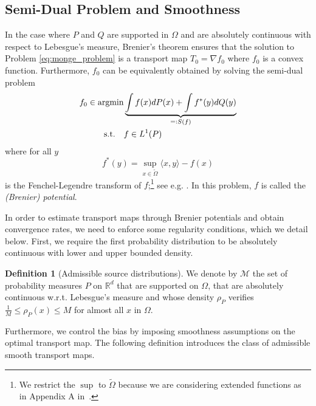 \documentclass{article}
\theoremstyle{plain}
\theoremstyle{definition}
\newtheorem{definition}[theorem]{Definition}
\theoremstyle{remark}
\newcommand{\R}[0]{\mathbb{R}}
\newcommand{\argmin}[0]{\operatorname{argmin}}
\newcommand{\defeq}{=\vcentcolon}
\begin{document}
\subsection{Semi-Dual Problem and Smoothness}

In the case where $P$ and $Q$ are supported in $\Omega$ and are absolutely continuous with respect to Lebesgue's measure, Brenier's theorem \cite{brenier1991polar} ensures that the solution to Problem \eqref{eq:monge_problem} is a transport map $ T_0 = \nabla f_0 $ where $f_0$ is a convex function. Furthermore, $f_0$ can be equivalently obtained by solving the semi-dual problem
\begin{equation}
\label{eq:semi_dual_problem}
    \begin{aligned}
f_0 \in \argmin & \underbrace{\int f(x) dP(x) + \int f^*(y) dQ(y)}_{\defeq S(f)}\\
\textrm{s.t.} \quad & f \in L^1(P)
\end{aligned}
\end{equation}
where for all $y$
\begin{equation}
    f^*(y) = \sup_{x \in \tilde{\Omega}} \langle x, y \rangle - f(x)
\end{equation}
is the Fenchel-Legendre transform of $f$;\footnote{We restrict the $\sup$ to $\tilde{\Omega}$ because we are considering extended functions as in Appendix A in~\cite{hutter2021minimax}.} see e.g. \cite{ruschendorf1990characterization}. In this problem, $f$ is called the \emph{(Brenier) potential}. 


In order to estimate transport maps through Brenier potentials and obtain convergence rates, we need to enforce some regularity conditions, which we detail below. 
First, we require the first probability distribution to be absolutely continuous with lower and upper bounded density.

\begin{definition}[Admissible source distributions]
    We denote by $\mathcal{M}$ the set of probability measures $P$ on $\R^d$ that are supported on $\Omega$, that are absolutely continuous w.r.t. Lebesgue's measure and whose density $\rho_P$ verifies $\frac{1}{M} \leq \rho_P(x) \leq M$ for almost all $x$ in $\Omega$.
\end{definition}

Furthermore, we control the bias by imposing smoothness assumptions on the optimal transport map. 
The following definition introduces the class of admissible smooth transport maps.
\end{document}
